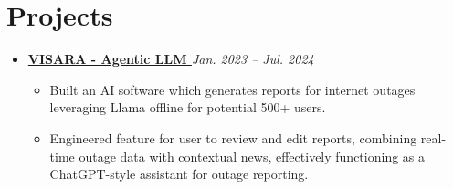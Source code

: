\documentclass[A4,10pt]{article}
\begin{document}
\section{\textcolor{NavyBlue}{Projects}}

\begin{itemize}[leftmargin=0in, label={}]

    \item  \textbf{\href{https://github.com/b18050/visara}{ VISARA - Agentic LLM }} 
 \hfill \textit{Jan. 2023 -- Jul. 2024}
  \vspace{-1.5mm}
    \begin{itemize}[leftmargin=0.25in]
        \item Built an AI software which generates reports for internet outages leveraging Llama offline for potential 500+ users.
        \item Engineered feature for user to review and edit reports, combining real-time outage data with contextual news, effectively functioning as a ChatGPT-style assistant for outage reporting.
    \end{itemize}
     \vspace{-1.5mm}


\end{itemize}
\end{document}

